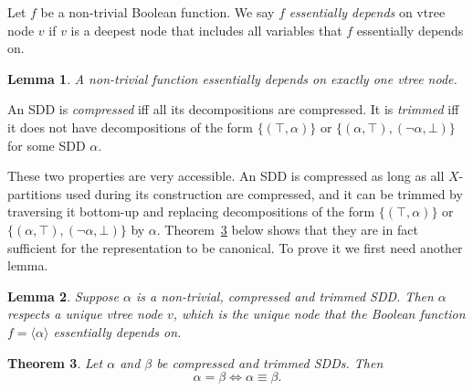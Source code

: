\documentclass[11pt]{report}
\newtheorem{theorem}{Theorem}[section]
\newtheorem{lemma}[theorem]{Lemma}
\newenvironment{definition}[1][Definition]{\begin{trivlist}
\item[\hskip \labelsep {\bfseries #1}]}{\end{trivlist}}
\begin{document}
\begin{definition}
Let $f$ be a non-trivial Boolean function. We say $f$ \textit{essentially depends} on vtree node $v$ if $v$ is a deepest node that includes all variables that $f$ essentially depends on. 
\end{definition}

\begin{lemma}
A non-trivial function essentially depends on exactly one vtree node.
\label{unique_vtree_function}
\end{lemma} 
 
\begin{definition}
An SDD is \textit{compressed} iff all its decompositions are compressed. It is \textit{trimmed} iff it does not have decompositions of the form $\{(\top, \alpha)\}$ or $\{(\alpha, \top), (\lnot\alpha, \bot)\}$ for some SDD $\alpha$.
\end{definition}


These two properties are very accessible. An SDD is compressed as long as all $X$-partitions used during its construction are compressed, and it can be trimmed by traversing it bottom-up and replacing decompositions of the form  $\{(\top, \alpha)\}$ or $\{(\alpha, \top), (\lnot\alpha, \bot)\}$ by $\alpha$. 
Theorem~\ref{canonicity} below shows that they are in fact sufficient for the representation to be canonical. To prove it we first need another lemma. 

\begin{lemma}
Suppose $\alpha$ is a non-trivial, compressed and trimmed SDD. Then $\alpha$ respects a unique vtree node $v$, which is the unique node that the Boolean function $f = \langle \alpha \rangle$ essentially depends on.
\label{unique_vtree_sdd}
\end{lemma}

\begin{theorem} 
\label{canonicity}
Let $\alpha$ and $\beta$ be compressed and trimmed SDDs. Then $$\alpha = \beta \Leftrightarrow \alpha \equiv \beta.$$
\end{theorem}
\end{document}
